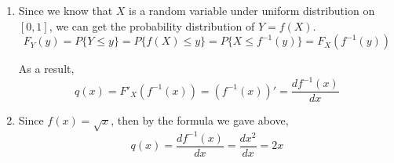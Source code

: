 \documentclass[11pt]{article}
\begin{document}
	\begin{enumerate}
		\item Since we know that $X$ is a random variable under uniform distribution on $[0, 1]$, we can get the probability distribution of $Y = f(X)$.
		\[F_Y(y) = P\{Y \leq y\} = P\{f(X) \leq y\} = P\{X \leq f^{-1}(y)\} = F_X(f^{-1}(y))\]
		
		As a result,
		\[q(x) = F'_X(f^{-1}(x)) = (f^{-1}(x))' =\frac{df^{-1}(x)}{dx}\]
		
		\item Since $f(x) = \sqrt{x}$, then by the formula we gave above, 
			\[q(x) = \frac{df^{-1}(x)}{dx} = \frac{dx^2}{dx} = 2x\]
	\end{enumerate}
\end{document}
